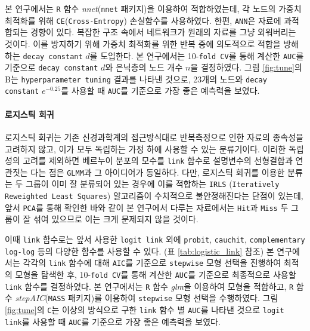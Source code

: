\documentclass[11pt,onecolumn,twoside,a4size]{gsag3jnl}
\begin{document}
본 연구에서는 \texttt{R} 함수 \textit{nnet}(\texttt{nnet} 패키지)을 이용하여 적합하였는데, 각 노드의 가중치 최적화를 위해 \texttt{CE}(\texttt{Cross-Entropy}) 손실함수를 사용하였다. 한편, \texttt{ANN}은 자료에 과적합되는 경향이 있다. 복잡한 구조 속에서 네트워크가 원래의 자료를 그냥 외워버리는 것이다. 이를 방지하기 위해 가중치 최적화를 위한 반복 중에 의도적으로 적합을 방해하는 \texttt{decay constant} $d$를 도입한다. 본 연구에서는 10-\texttt{fold CV}를 통해 계산한 \texttt{AUC}를 기준으로 \texttt{decay constant} $d$와 은닉층의 노드 개수 $n$을 결정하였다. 그림 \ref{fig:tune}의 B는 \texttt{hyperparameter tuning} 결과를 나타낸 것으로, 23개의 노드와 \texttt{decay constant} $e^{-0.25}$를 사용할 때 \texttt{AUC}를 기준으로 가장 좋은 예측력을 보였다.

\paragraph{로지스틱 회귀}

로지스틱 회귀는 기존 신경과학계의 접근방식대로 반복측정으로 인한 자료의 종속성을 고려하지 않고, 이가 모두 독립하는 가정 하에 사용할 수 있는 분류기이다. 이러한 독립성의 고려를 제외하면 베르누이 분포의 모수를 \texttt{link} 함수로 설명변수의 선형결합과 연관짓는 다는 점은 \texttt{GLMM}과 그 아이디어가 동일하다. 다만, 로지스틱 회귀를 이용한 분류는 두 그룹이 이미 잘 분류되어 있는 경우에 이를 적합하는 \texttt{IRLS} (\texttt{Iteratively Reweighted Least Squares}) 알고리즘이 수치적으로 불안정해진다는 단점이 있는데, 앞서 \texttt{PCA}를 통해 확인한 바와 같이 본 연구에서 다루는 자료에서는 \texttt{Hit}과 \texttt{Miss} 두 그룹이 잘 섞여 있으므로 이는 크게 문제되지 않을 것이다.

이때 \texttt{link} 함수로는 앞서 사용한 \texttt{logit link} 외에 \texttt{probit}, \texttt{cauchit}, \texttt{complementary log-log} 등의 다양한 함수를 사용할 수 있다. (표 \ref{tab:logistic_link} 참조) 본 연구에서는 각각의 \texttt{link} 함수에 대해 \texttt{AIC}를 기준으로 \texttt{stepwise} 모형 선택을 진행하여 최적의 모형을 탐색한 후, 10-\texttt{fold CV}를 통해 계산한 \texttt{AUC}를 기준으로 최종적으로 사용할 \texttt{link} 함수를 결정하였다. 본 연구에서는 \texttt{R} 함수 \textit{glm}을 이용하여 모형을 적합하고, \texttt{R} 함수 \textit{stepAIC}(\texttt{MASS} 패키지)를 이용하여 \texttt{stepwise} 모형 선택을 수행하였다. 그림 \ref{fig:tune}의 \texttt{C}는 이상의 방식으로 구한 \texttt{link} 함수 별 \texttt{AUC}를 나타낸 것으로 \texttt{logit link}를 사용할 때 \texttt{AUC}를 기준으로 가장 좋은 예측력을 보였다.
\end{document}

